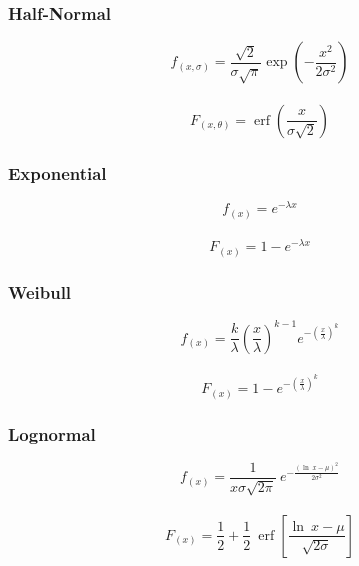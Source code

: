 \documentclass[11pt]{article}
\DeclareMathOperator\erf{erf}
\begin{document}
\begin{linenumbers}
\subsubsection{Half-Normal}
\begin{Large}
	\begin{equation}
	f_{(x, \sigma)} = \frac{\sqrt{2}}{\sigma \sqrt{\pi}} \exp \left(-\frac{x^2}{2 \sigma^2}\right)
	\end{equation}\\
	\begin{equation}
		F_{(x, \theta)} = \erf\left(\frac{x}{\sigma \sqrt{2}}\right)
	\end{equation}
\end{Large}

\subsubsection{Exponential}
\begin{Large}
	\begin{equation}
	f_{(x)} = e^{-\lambda x}
	\end{equation}\\
	\begin{equation}
	F_{(x)} = 1 - e^{-\lambda x}
	\end{equation}
\end{Large}

\subsubsection{Weibull}
\begin{Large}
	\begin{equation}
	f_{(x)} = \frac{k}{\lambda} \left(\frac{x}{\lambda}\right)^{k-1} e^{-\left(\frac{x}{\lambda}\right)^k}
	\end{equation}\\
	\begin{equation}
	F_{(x)} = 1 - e^{- \left(\frac{x}{\lambda}\right)^k}
	\end{equation}
\end{Large}

\subsubsection{Lognormal} 
\begin{Large}
	\begin{equation}
	f_{(x)} = \frac{1}{x \sigma \sqrt{2 \pi}}\ e^{- \frac{(\ln\ x - \mu)^2}{2\sigma^2}}
	\end{equation}\\
	\begin{equation}
	F_{(x)} = \frac{1}{2} + \frac{1}{2}\ \erf\left[\frac{\ln\ x - \mu}{\sqrt{2 \sigma}}\right]
	\end{equation}
\end{Large}


\end{linenumbers}
\end{document}
